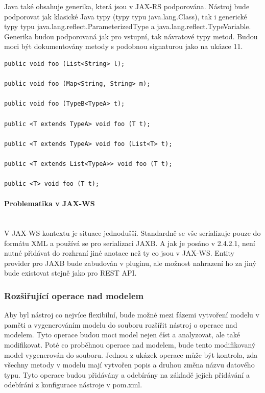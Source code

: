 \documentclass[11pt,twoside,a4paper]{book}
\begin{document}
Java také obsahuje generika, která jsou v JAX-RS podporována. Nástroj bude podporovat jak
klasické Java typy (typy typu java.lang.Class), tak i generické typy typu
java.lang.reflect.ParameterizedType a java.lang.reflect.TypeVariable. Generika
budou podporovaná jak pro vstupní, tak návratové typy metod. Budou moci být 
dokumentovány metody s podobnou signaturou jako na ukázce 11.

\begin{lstlisting}[frame=single]
public void foo (List<String> l);

public void foo (Map<String, String> m);

public void foo (TypeB<TypeA> t);

public <T extends TypeA> void foo (T t);

public <T extends TypeA> void foo (List<T> t);

public <T extends List<TypeA>> void foo (T t);

public <T> void foo (T t);
\end{lstlisting}

\paragraph{Problematika v JAX-WS}
\mbox{}\\

V JAX-WS kontextu je situace jednodušší. Standardně se vše serializuje pouze do formátu
XML a používá se pro serializaci JAXB. A jak je posáno v 2.4.2.1, není nutné přidávat do
rozhraní jiné anotace než ty co jsou v JAX-WS. Entity provider pro JAXB bude zabudován v
pluginu, ale možnost nahrazení ho za jiný bude existovat stejně jako pro REST API.

\subsubsection{Rozšiřující operace nad modelem}

Aby byl nástroj co nejvíce flexibilní, bude možné mezi fázemi vytvoření modelu v paměti a
vygenerováním modelu do souboru rozšířit nástroj o operace nad modelem. Tyto operace
budou moci model nejen číst a analyzovat, ale také modifikovat. Poté co proběhnou operace
nad modelem, bude tento modifikovaný model vygenerován do souboru. Jednou z ukázek
operace může být kontrola, zda všechny metody v modelu mají vytvořen popis a druhou
změna názvu datového typu. Tyto operace budou přidávány a odebírány na základě jejich
přidávání a odebírání z konfigurace nástroje v pom.xml.
\end{document}
